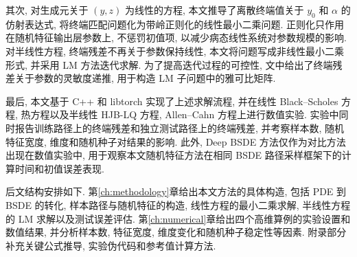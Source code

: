     其次, 对生成元关于 $(y,z)$ 为线性的方程,
    本文推导了离散终端值关于 $y_0$ 和 $\alpha$ 的仿射表达式,
    将终端匹配问题化为带岭正则化的线性最小二乘问题.
    正则化只作用在随机特征输出层参数上, 不惩罚初值项,
    以减少病态线性系统对参数规模的影响.
    对半线性方程, 终端残差不再关于参数保持线性,
    本文将问题写成非线性最小二乘形式, 并采用 LM 方法迭代求解.
    为了提高迭代过程的可控性, 文中给出了终端残差关于参数的灵敏度递推,
    用于构造 LM 子问题中的雅可比矩阵.

    最后, 本文基于 C++ 和 libtorch 实现了上述求解流程,
    并在线性 Black--Scholes 方程, 热方程以及半线性 HJB-LQ 方程, Allen--Cahn 方程上进行数值实验.
    实验中同时报告训练路径上的终端残差和独立测试路径上的终端残差,
    并考察样本数, 随机特征宽度, 维度和随机种子对结果的影响.
    此外, Deep BSDE 方法仅作为对比方法出现在数值实验中,
    用于观察本文随机特征方法在相同 BSDE 路径采样框架下的计算时间和初值误差表现.

    后文结构安排如下.
    第\ref{ch:methodology}章给出本文方法的具体构造,
    包括 PDE 到 BSDE 的转化, 样本路径与随机特征的构造,
    线性方程的最小二乘求解, 半线性方程的 LM 求解以及测试误差评估.
    第\ref{ch:numerical}章给出四个高维算例的实验设置和数值结果,
    并分析样本数, 特征宽度, 维度变化和随机种子稳定性等因素.
    附录部分补充关键公式推导, 实验伪代码和参考值计算方法.

